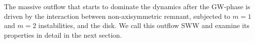 %
%
%

The massive outflow that starts to dominate the \pmerg{} dynamics after the \ac{GW}-phase 
is driven by the interaction between non-axisymmetric 
remnant, subjected to $m=1$ and $m=2$ instabilities, and the disk.
We call this outflow \ac{SWW} and examine its properties in detail in the next section. 

%
%

